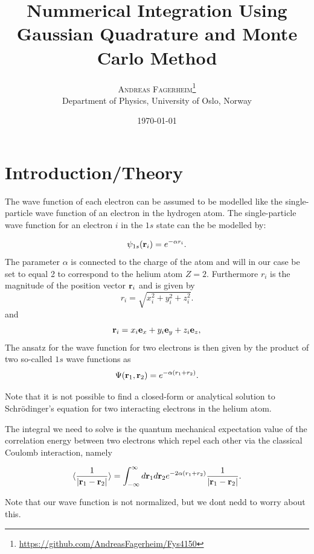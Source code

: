 \documentclass[twoside,twocolumn]{article}
\title{Nummerical Integration Using Gaussian Quadrature and Monte Carlo Method } %
\author{%
\textsc{Andreas Fagerheim}\thanks{\url{https://github.com/AndreasFagerheim/Fys4150}} \\[1ex] %
\normalsize Department of Physics, University of Oslo, Norway \\ %
}
\date{\today} %
\begin{document}
\maketitle


\section{Introduction/Theory}

The wave function of each electron can be assumed to be modelled like
the single-particle wave function of an electron in the hydrogen
atom. The single-particle wave function for an electron $i$ in the
$1s$ state can the be modelled by:



\begin{equation}
		\psi_{1s}({\bf r}_i)  =   e^{-\alpha r_i}.
\end{equation}
The parameter $\alpha$ is connected to the charge of the atom and will in our case be set to equal 2 to correspond to the helium atom $Z = 2$. Furthermore $r_i$ is the magnitude of the position vector ${\bf r}_i$ and is given by
\[
r_i = \sqrt{x_i^2+y_i^2+z_i^2}.
\]
and
\[
   {\bf r}_i =  x_i {\bf e}_x + y_i {\bf e}_y +z_i {\bf e}_z ,
\]
The ansatz for the wave function for two electrons is then given by the product of two 
so-called 
$1s$ wave functions as 
\[
   \Psi({\bf r}_1,{\bf r}_2)  =   e^{-\alpha (r_1+r_2)}.
\]

Note that it is not possible to find a closed-form or analytical
solution to Schr\"odinger's equation for two interacting electrons in
the helium atom.

The integral we need to solve is the quantum mechanical expectation
value of the correlation energy between two electrons which repel each
other via the classical Coulomb interaction, namely

\begin{equation} \label{integral}
   \langle \frac{1}{|{\bf r}_1-{\bf r}_2|} \rangle=\int_{-\infty}^{\infty} d{\bf r}_1d{\bf r}_2  e^{-2\alpha (r_1+r_2)}\frac{1}{|{\bf r}_1-{\bf r}_2|}.
\end{equation}

Note that our wave function is not normalized, but we dont nedd to worry about this.
\end{document}
